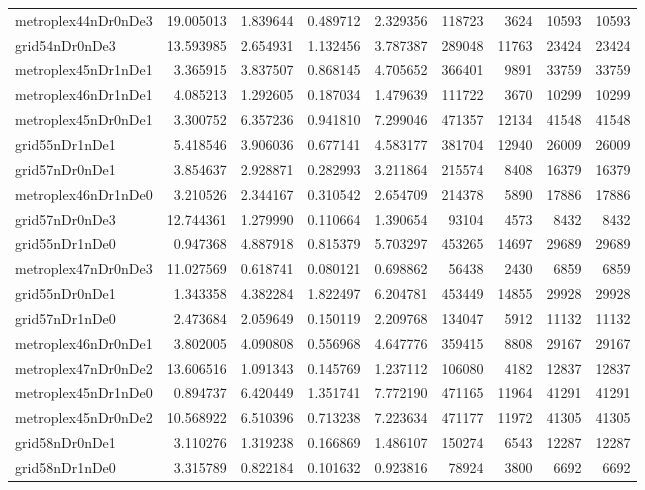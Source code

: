 \begin{longtable}{|l|r|r|r|r|r|r|r|r|}
metroplex44nDr0nDe3 & 19.005013 & 1.839644 & 0.489712 & 2.329356 & 118723 & 3624 & 10593 & 10593 \\
grid54nDr0nDe3 & 13.593985 & 2.654931 & 1.132456 & 3.787387 & 289048 & 11763 & 23424 & 23424 \\
metroplex45nDr1nDe1 & 3.365915 & 3.837507 & 0.868145 & 4.705652 & 366401 & 9891 & 33759 & 33759 \\
metroplex46nDr1nDe1 & 4.085213 & 1.292605 & 0.187034 & 1.479639 & 111722 & 3670 & 10299 & 10299 \\
metroplex45nDr0nDe1 & 3.300752 & 6.357236 & 0.941810 & 7.299046 & 471357 & 12134 & 41548 & 41548 \\
grid55nDr1nDe1 & 5.418546 & 3.906036 & 0.677141 & 4.583177 & 381704 & 12940 & 26009 & 26009 \\
grid57nDr0nDe1 & 3.854637 & 2.928871 & 0.282993 & 3.211864 & 215574 & 8408 & 16379 & 16379 \\
metroplex46nDr1nDe0 & 3.210526 & 2.344167 & 0.310542 & 2.654709 & 214378 & 5890 & 17886 & 17886 \\
grid57nDr0nDe3 & 12.744361 & 1.279990 & 0.110664 & 1.390654 & 93104 & 4573 & 8432 & 8432 \\
grid55nDr1nDe0 & 0.947368 & 4.887918 & 0.815379 & 5.703297 & 453265 & 14697 & 29689 & 29689 \\
metroplex47nDr0nDe3 & 11.027569 & 0.618741 & 0.080121 & 0.698862 & 56438 & 2430 & 6859 & 6859 \\
grid55nDr0nDe1 & 1.343358 & 4.382284 & 1.822497 & 6.204781 & 453449 & 14855 & 29928 & 29928 \\
grid57nDr1nDe0 & 2.473684 & 2.059649 & 0.150119 & 2.209768 & 134047 & 5912 & 11132 & 11132 \\
metroplex46nDr0nDe1 & 3.802005 & 4.090808 & 0.556968 & 4.647776 & 359415 & 8808 & 29167 & 29167 \\
metroplex47nDr0nDe2 & 13.606516 & 1.091343 & 0.145769 & 1.237112 & 106080 & 4182 & 12837 & 12837 \\
metroplex45nDr1nDe0 & 0.894737 & 6.420449 & 1.351741 & 7.772190 & 471165 & 11964 & 41291 & 41291 \\
metroplex45nDr0nDe2 & 10.568922 & 6.510396 & 0.713238 & 7.223634 & 471177 & 11972 & 41305 & 41305 \\
grid58nDr0nDe1 & 3.110276 & 1.319238 & 0.166869 & 1.486107 & 150274 & 6543 & 12287 & 12287 \\
grid58nDr1nDe0 & 3.315789 & 0.822184 & 0.101632 & 0.923816 & 78924 & 3800 & 6692 & 6692 \\

\end{longtable}
